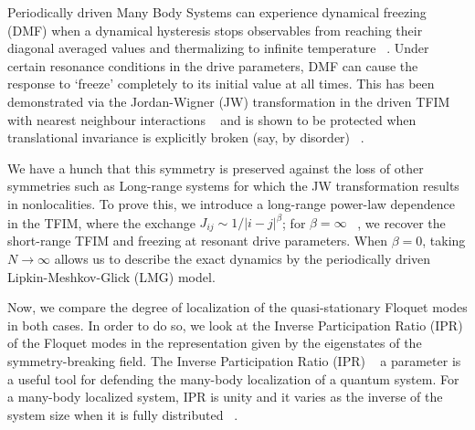 \documentclass[%
 reprint,
 amsmath,amssymb,
 aps,
]{revtex4-2}
\begin{document}
\maketitle


Periodically driven Many Body Systems can experience dynamical freezing (DMF) when a dynamical hysteresis stops observables from reaching their diagonal averaged values and thermalizing to infinite temperature ~\cite{bordia_periodically_2017, sahoo_periodically_2019, das_exotic_2010}. Under certain resonance conditions in the drive parameters, DMF can cause the response to ‘freeze’ completely to its initial value at all times. This has been demonstrated via the Jordan-Wigner (JW) transformation in the driven TFIM with nearest neighbour interactions ~\cite{mbeng_quantum_2020} and is shown to be protected when translational invariance is explicitly broken (say, by disorder) ~\cite{yamada_localization_2022, roy_fate_2015}. 

We have a hunch that this symmetry is preserved against the loss of other symmetries such as Long-range systems for which the JW transformation results in nonlocalities. To prove this, we introduce a long-range power-law dependence in the TFIM, where the exchange $J_{ij}\sim 1/|i-j|^\beta$; for $\beta=\infty$ ~\cite{campa_statistical_2009, eisele_multiple_1988, canning_class_1992}, we recover the short-range TFIM and freezing at resonant drive parameters. When $\beta=0$, taking $N\rightarrow\infty$ allows us to describe the exact dynamics by the periodically driven Lipkin-Meshkov-Glick (LMG) model.

Now, we compare the degree of localization of the quasi-stationary Floquet modes in both cases. In order to do so, we look at the Inverse Participation Ratio (IPR) of the Floquet modes in the representation given by the eigenstates of the symmetry-breaking field. The Inverse Participation Ratio (IPR) ~\cite{murphy_generalized_2011} a parameter is a useful tool for defending the many-body localization of a quantum system. For a many-body localized system, IPR is unity and it varies as the inverse of the system size when it is fully distributed ~\cite{calixto_inverse_2015}.
\end{document}
